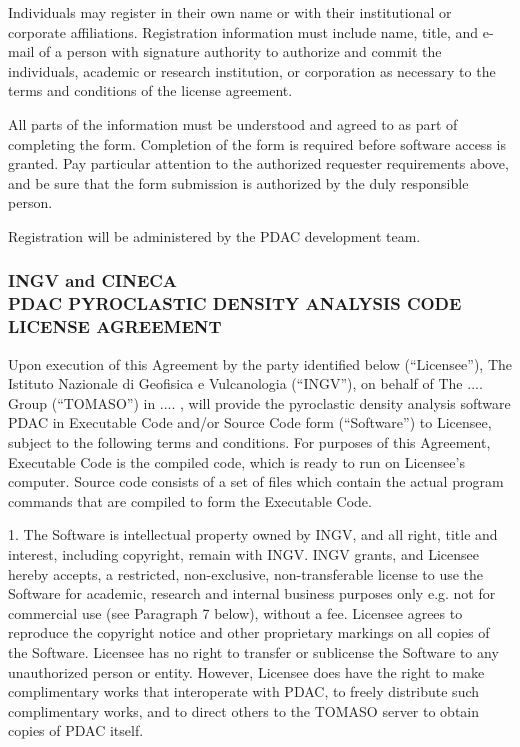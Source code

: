 Individuals may register in their own name or with their institutional or
corporate affiliations. Registration information must include name, title, 
and e-mail of a person with signature authority to authorize and commit the
individuals, academic or research institution, or corporation as necessary 
to the terms and conditions of the license agreement.

All parts of the information must be understood and agreed to as part of
completing the form. Completion of the form is required before software 
access is granted. Pay particular attention to the authorized requester 
requirements above, and be sure that the form submission is authorized 
by the duly responsible person.

Registration will be administered by the PDAC development team.

\newpage
\subsubsection*{INGV and CINECA \\
PDAC PYROCLASTIC DENSITY ANALYSIS CODE LICENSE AGREEMENT}

Upon execution of this Agreement by the party identified below (``Licensee''),
The Istituto Nazionale di Geofisica e Vulcanologia (``INGV''), on 
behalf of The .... Group (``TOMASO'') in .... ,
will provide the pyroclastic density analysis software PDAC in Executable 
Code and/or Source Code form (``Software'') to Licensee, subject to 
the following terms and conditions. For purposes of this Agreement, 
Executable Code is the compiled code, which is ready to run on Licensee's 
computer. Source code consists of a set of files which contain the 
actual program commands that are compiled to form the Executable Code.

1. The Software is intellectual property owned by INGV, and all 
right, title and interest, including copyright, remain with INGV. 
INGV grants, and Licensee hereby accepts, a restricted, non-exclusive, 
non-transferable license to use the Software for academic, research 
and internal business purposes only e.g. not for commercial use 
(see Paragraph 7 below), without a fee. Licensee agrees to reproduce 
the copyright notice and other proprietary markings on all copies of 
the Software. Licensee has no right to transfer or sublicense the 
Software to any unauthorized person or entity. However, Licensee does 
have the right to make complimentary works that interoperate with PDAC, 
to freely distribute such complimentary works, and to direct others 
to the TOMASO server to obtain copies of PDAC itself.

